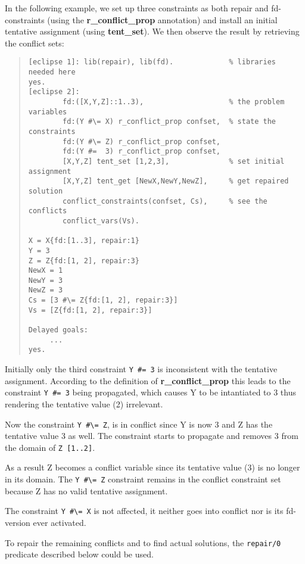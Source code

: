 In the following example, we set up three constraints as both repair and
fd-constraints (using the {\bf r_conflict_prop} annotation) and
install an initial tentative assignment (using {\bf tent_set}).
We then observe the result by retrieving the conflict sets:
\begin{quote}
\begin{verbatim}
[eclipse 1]: lib(repair), lib(fd).             % libraries needed here
yes.
[eclipse 2]:
        fd:([X,Y,Z]::1..3),                    % the problem variables
        fd:(Y #\= X) r_conflict_prop confset,  % state the constraints
        fd:(Y #\= Z) r_conflict_prop confset,
        fd:(Y #=  3) r_conflict_prop confset,
        [X,Y,Z] tent_set [1,2,3],              % set initial assignment
        [X,Y,Z] tent_get [NewX,NewY,NewZ],     % get repaired solution
        conflict_constraints(confset, Cs),     % see the conflicts
        conflict_vars(Vs).

X = X{fd:[1..3], repair:1}
Y = 3
Z = Z{fd:[1, 2], repair:3}
NewX = 1
NewY = 3
NewZ = 3
Cs = [3 #\= Z{fd:[1, 2], repair:3}]
Vs = [Z{fd:[1, 2], repair:3}]

Delayed goals:
     ...
yes.
\end{verbatim}
\end{quote}
Initially only the third constraint \verb+Y #= 3+ is inconsistent with the
tentative assignment. According to the definition of {\bf r_conflict_prop}
this leads to
the constraint \verb+Y #= 3+ being propagated, which causes Y to be intantiated to 3
thus rendering the tentative value (2) irrelevant.

Now the constraint \verb+Y #\= Z+, is in conflict since Y is now 3 and Z has the
tentative value 3 as well. The constraint starts to propagate and removes 3
from the domain of \verb+Z [1..2]+. 

As a result Z becomes a conflict variable since its tentative value (3)
is no longer in its domain. The \verb+Y #\= Z+ constraint remains in the
conflict constraint set because Z has no valid tentative assignment.

The constraint \verb+Y #\= X+ is not affected, it neither goes into conflict
nor is its fd-version ever activated.

To repair the remaining conflicts and to find actual solutions,
the \verb+repair/0+ predicate described below could be used.


